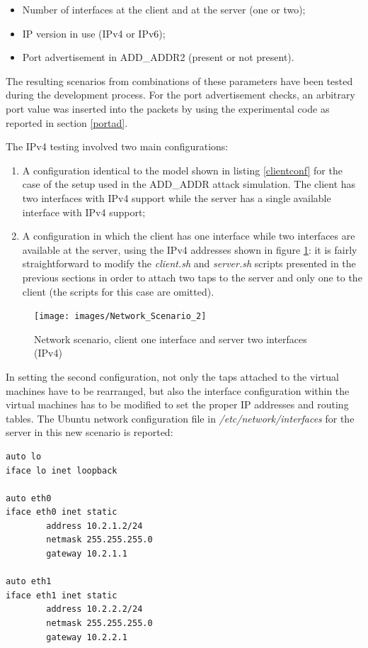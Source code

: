 \begin{itemize}
  \item Number of interfaces at the client and at the server (one or two);
  \item IP version in use (IPv4 or IPv6);
  \item Port advertisement in ADD\_ADDR2 (present or not present).
\end{itemize}

The resulting scenarios from combinations of these parameters have been tested during the development process. For the port advertisement checks, an arbitrary port value was inserted into the packets by using the experimental code as reported in section \ref{portad}.

The IPv4 testing involved two main configurations:
\begin{enumerate}
  \item A configuration identical to the model shown in listing \ref{clientconf} for the case of the setup used in the ADD\_ADDR attack simulation. The client has two interfaces with IPv4 support while the server has a single available interface with IPv4 support;
  \item  A configuration in which the client has one interface while two interfaces are available at the server, using the IPv4 addresses shown in figure \ref{fig:network2}: it is fairly straightforward to modify the \textit{client.sh} and \textit{server.sh} scripts presented in the previous sections in order to attach two taps to the server and only one to the client (the scripts for this case are omitted).
\end{enumerate}

\begin{figure}[!htb]
\centering
\texttt{[image: images/Network\_Scenario\_2]}
\caption{Network scenario, client one interface and server two interfaces (IPv4)}
\label{fig:network2}
\end{figure}

In setting the second configuration, not only the taps attached to the virtual machines have to be rearranged, but also the interface configuration within the virtual machines has to be modified to set the proper IP addresses and routing tables. The Ubuntu network configuration file in \textit{/etc/network/interfaces} for the server in this new scenario is reported:

\begin{verbatim}
auto lo
iface lo inet loopback

auto eth0
iface eth0 inet static
        address 10.2.1.2/24
        netmask 255.255.255.0
        gateway 10.2.1.1

auto eth1
iface eth1 inet static
        address 10.2.2.2/24
        netmask 255.255.255.0
        gateway 10.2.2.1
\end{verbatim}

